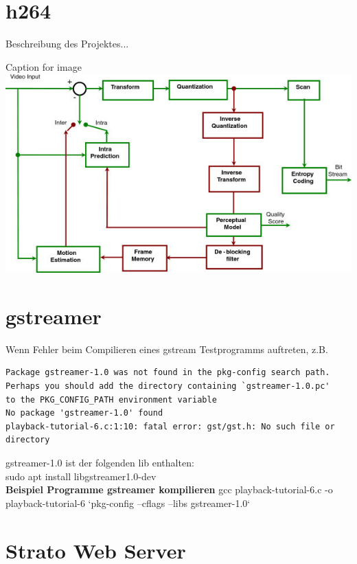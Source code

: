 \section{h264}

Beschreibung des Projektes...


\begin{minipage}{\textwidth}
    \begin{center}
        Caption for image
        \includegraphics[scale=4.0]{img/h264.jpg} 
    \end{center}
\end{minipage}



\section{gstreamer}

Wenn Fehler beim Compilieren eines gstream Testprogramms auftreten, z.B.
\begin{verbatim}
Package gstreamer-1.0 was not found in the pkg-config search path.
Perhaps you should add the directory containing `gstreamer-1.0.pc'
to the PKG_CONFIG_PATH environment variable
No package 'gstreamer-1.0' found
playback-tutorial-6.c:1:10: fatal error: gst/gst.h: No such file or directory
\end{verbatim}

gstreamer-1.0 ist der folgenden lib enthalten:\\
sudo apt install libgstreamer1.0-dev\\

\textbf{Beispiel Programme gstreamer kompilieren}
gcc playback-tutorial-6.c -o playback-tutorial-6 `pkg-config --cflags --libs gstreamer-1.0`

\section{Strato Web Server}

